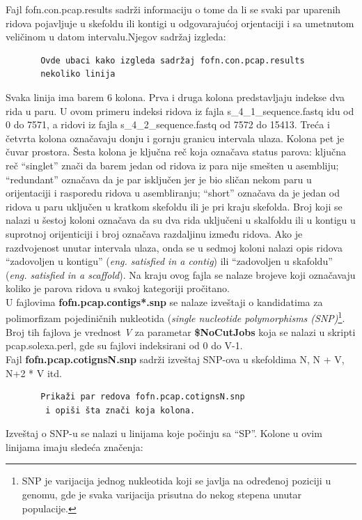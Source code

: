 \documentclass[a4paper]{article}
\begin{document}
{Fajl fofn.con.pcap.results sadrži informaciju o tome da li se svaki par uparenih ridova pojavljuje u skefoldu ili kontigi u odgovarajućoj orjentaciji i sa umetnutom veličinom u datom intervalu.Njegov sadržaj izgleda:
\begin{verbatim}
       Ovde ubaci kako izgleda sadržaj fofn.con.pcap.results
       nekoliko linija
\end{verbatim}
 Svaka linija ima barem 6 kolona. Prva i druga kolona predstavljaju indekse dva rida u paru. U ovom primeru indeksi ridova iz fajla s\_4\_1\_seque\-nce.fastq idu od 0 do 7571, a ridovi iz fajla s\_4\_2\_sequence.fastq  od 7572 do 15413. Treća i četvrta kolona označavaju donju i gornju granicu intervala ulaza. Kolona pet je čuvar prostora. Šesta kolona je ključna reč koja označava status parova: ključna reč ``singlet'' znači da barem jedan od ridova iz para nije smešten u asembliju; ``redundant'' označava da je par isključen jer je bio sličan nekom paru u orijentaciji i rasporedu ridova u asembliranju; ``short'' označava da je jedan od ridova u paru uključen u kratkom skefoldu ili je pri kraju skefolda. Broj koji se nalazi u šestoj koloni označava da su dva rida uključeni u skalfoldu ili u kontigu u suprotnoj orijenticiji i broj označava razdaljinu između ridova. Ako je razdvojenost unutar intervala ulaza, onda se u sedmoj koloni nalazi opis ridova ``zadovoljen u kontigu'' (\textit{eng. satisfied in a contig}) ili ``zadovoljen u skafoldu'' (\textit{eng. satisfied in a scaffold}). Na kraju ovog fajla se nalaze brojeve koji označavaju koliko je parova ridova u svakoj kategoriji pročitano.\\ 
U fajlovima \textbf{fofn.pcap.contigs*.snp} se nalaze izveštaji o kandidatima za polimorfizam pojediničnih nukleotida (\textit{single nucleotide polymorphisms (SNP)}\footnote{SNP je varijacija jednog nukleotida koji se javlja na određenoj poziciji u genomu, gde je svaka varijacija prisutna do nekog stepena unutar populacije.}. Broj tih fajlova je vrednost \textit{V} za parametar \textbf{\$NoCutJobs} koja se nalazi u skripti pcap.solexa.perl, gde su fajlovi indeksirani od 0 do V-1.\\ 
Fajl \textbf{fofn.pcap.cotignsN.snp} sadrži izveštaj SNP-ova u skefoldima N, N + V, N+2 * V itd.
 \begin{verbatim}
       Prikaži par redova fofn.pcap.cotignsN.snp
        i opiši šta znači koja kolona.
\end{verbatim}
Izveštaj o SNP-u se nalazi u linijama koje počinju sa ``SP''. Kolone u ovim linijama imaju sledeća značenja:
\begin{itemize}

\end{itemize}}
\end{document}
